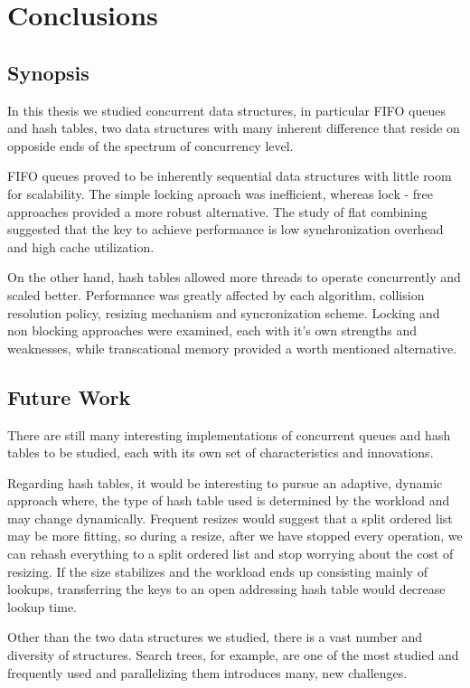 
\chapter{Conclusions}
\section{Synopsis}

In this thesis we studied concurrent data structures, in particular FIFO queues and hash tables, two data structures with many inherent difference that reside on opposide ends of the spectrum of concurrency level.

FIFO queues proved to be inherently sequential data structures with little room for scalability. The simple locking aproach was inefficient, whereas lock - free approaches provided a more robust alternative. The study of flat combining suggested that the key to achieve performance is low synchronization overhead and high cache utilization.

On the other hand, hash tables allowed more threads to operate concurrently and scaled better. Performance was greatly affected by each algorithm, collision resolution policy, resizing mechanism and syncronization scheme. Locking and non blocking approaches were examined, each with it's own strengths and weaknesses, while transcational memory provided a worth mentioned alternative.
 
\section{Future Work}

There are still many interesting implementations of concurrent queues and hash tables to be studied, each with its own set of characteristics and innovations. 

Regarding hash tables, it would be interesting to pursue an adaptive, dynamic approach where, the type of hash table used is determined by the workload and may change dynamically. Frequent resizes would suggest that a split ordered list may be more fitting, so during a resize, after we have stopped every operation, we can rehash everything to a split ordered list and stop worrying about the cost of resizing. If the size stabilizes and the workload ends up consisting mainly of lookups, transferring the keys to an open addressing hash table would decrease lookup time.

Other than the two data structures we studied, there is a vast number and diversity of structures. Search trees, for example, are one of the most studied and frequently used and parallelizing them introduces many, new challenges.

